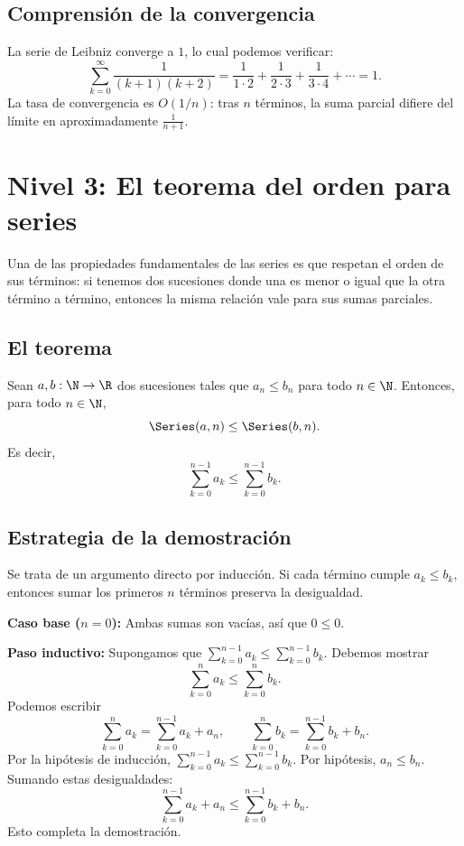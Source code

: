 \subsection{Comprensión de la convergencia}

La serie de Leibniz converge a $1$, lo cual podemos verificar:
\[
  \sum_{k=0}^{\infty} \frac{1}{(k+1)(k+2)} = \frac{1}{1\cdot 2} + \frac{1}{2\cdot 3} + \frac{1}{3\cdot 4} + \cdots = 1 .
\]
La tasa de convergencia es $O(1/n)$: tras $n$ términos, la suma parcial difiere del límite en aproximadamente $\frac{1}{n+1}$.

\section{Nivel 3: El teorema del orden para series}

Una de las propiedades fundamentales de las series es que respetan el orden de sus términos: si tenemos dos sucesiones donde una es menor o igual que la otra término a término, entonces la misma relación vale para sus sumas parciales.

\subsection{El teorema}

\begin{teorema}[SeriesOrderThm]
Sean $a, b : \N \to \R$ dos sucesiones tales que $a_n \le b_n$ para todo $n \in \N$. Entonces, para todo $n \in \N$,
\[
  \Series(a, n) \le \Series(b, n).
\]
Es decir,
\[
  \sum_{k=0}^{n-1} a_k \le \sum_{k=0}^{n-1} b_k .
\]
\end{teorema}

\subsection{Estrategia de la demostración}

Se trata de un argumento directo por inducción. Si cada término cumple $a_k \le b_k$, entonces sumar los primeros $n$ términos preserva la desigualdad.

\textbf{Caso base ($n=0$):} Ambas sumas son vacías, así que $0 \le 0$.

\textbf{Paso inductivo:} Supongamos que $\sum_{k=0}^{n-1} a_k \le \sum_{k=0}^{n-1} b_k$. Debemos mostrar
\[
  \sum_{k=0}^{n} a_k \le \sum_{k=0}^{n} b_k .
\]
Podemos escribir
\[
  \sum_{k=0}^{n} a_k = \sum_{k=0}^{n-1} a_k + a_n ,
  \qquad
  \sum_{k=0}^{n} b_k = \sum_{k=0}^{n-1} b_k + b_n .
\]
Por la hipótesis de inducción, $\sum_{k=0}^{n-1} a_k \le \sum_{k=0}^{n-1} b_k$. Por hipótesis, $a_n \le b_n$. Sumando estas desigualdades:
\[
  \sum_{k=0}^{n-1} a_k + a_n \le \sum_{k=0}^{n-1} b_k + b_n .
\]
Esto completa la demostración.

